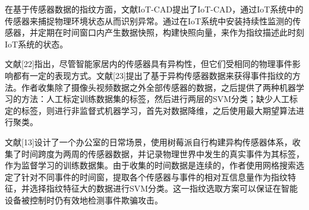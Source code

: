 在基于传感器数据的指纹方面，文献{IoT-CAD}提出了IoT-CAD，通过IoT系统中的传感器来捕捉物理环境状态从而识别异常。通过在IoT系统中安装持续性监测的传感器，并定期在时间窗口内产生数据快照，构建快照向量，来作为指纹描述此时刻IoT系统的状态。

文献[22]指出，尽管智能家居内的传感器具有异构性，但它们受相同的物理事件影响都有一定的表现方式。文献[23]提出了基于异构传感器数据来获得事件指纹的方法。作者收集除了摄像头视频数据之外全部传感器的数据，之后提供了两种机器学习的方法：人工标定训练数据集的标签，然后进行两层的SVM分类；缺少人工标定的标签，则进行非监督式机器学习，首先对数据降维，之后使用最大期望算法进行聚类。

文献[13]设计了一个办公室的日常场景，使用树莓派自行构建异构传感器体系，收集了时间跨度为两周的传感器数据，并记录物理世界中发生的真实事件为其标签，作为监督学习的训练数据集。由于收集的时间数据是连续的，作者使用网格搜索选定了针对不同事件的时间窗，提取各个传感器与事件的相对互信息量作为指纹特征，并选择指纹特征大的数据进行SVM分类。这一指纹选取方案可以保证在智能设备被控制时仍有效地检测事件欺骗攻击。

